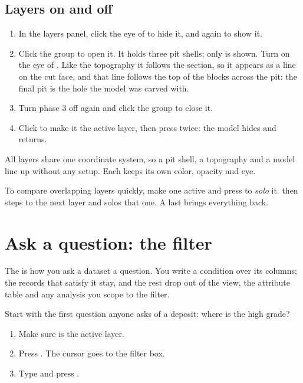 \subsection{Layers on and off}
\begin{tryit}
\begin{enumerate}
\item In the layers panel, click the eye of  to hide it, and again to show it.
\item Click the  group to open it. It holds three pit shells; only  is shown. Turn on the eye of . Like the topography it follows the section, so it appears as a line on the cut face, and that line follows the top of the blocks across the pit: the final pit is the hole the model was carved with.
\item Turn phase 3 off again and click the group to close it.
\item Click  to make it the active layer, then press  twice: the model hides and returns.
\end{enumerate}
\end{tryit}

All layers share one coordinate system, so a pit shell, a topography and a model line up without any setup. Each keeps its own color, opacity and eye.

\begin{tip}
To compare overlapping layers quickly, make one active and press  to \emph{solo} it. \key{]} then steps to the next layer and  solos that one. A last  brings everything back.
\end{tip}

\section{Ask a question: the filter}\label{sec:tour-filter}
The  is how you ask a dataset a question. You write a condition over its columns; the records that satisfy it stay, and the rest drop out of the view, the attribute table and any analysis you scope to the filter.

Start with the first question anyone asks of a deposit: where is the high grade?

\begin{tryit}
\begin{enumerate}
\item Make sure  is the active layer.
\item Press \key{/}. The cursor goes to the filter box.
\item Type  and press .
\end{enumerate}
\end{tryit}

